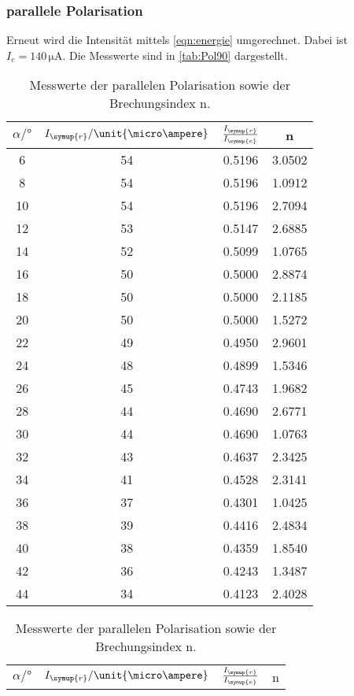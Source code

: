 \subsubsection{parallele Polarisation}
Erneut wird die Intensität mittels \autoref{eqn:energie} umgerechnet. Dabei ist $I_e = 140 \, \unit{\micro\ampere}$. Die Messwerte sind in 
\autoref{tab:Pol90} dargestellt.
\begin{table}
    \centering
    \caption{Messwerte der parallelen Polarisation sowie der Brechungsindex n.}
    \begin{tabular}{c c c c}
        \toprule
        $\alpha \mathrm{/} \unit{\degree}$  & $I_{\symup{r}}\mathrm{/}\unit{\micro\ampere}$ & $\frac{I_{\symup{r}}}{I_{\symup{e}}}$ & n\\
        \midrule
        6 & 54 & 0.5196 & 3.0502 \\
        8 & 54 & 0.5196 & 1.0912 \\
       10 & 54 & 0.5196 & 2.7094 \\
       12 & 53 & 0.5147 & 2.6885 \\
       14 & 52 & 0.5099 & 1.0765 \\
        16 & 50 & 0.5000 & 2.8874 \\
        18 & 50 & 0.5000 & 2.1185 \\
        20 & 50 & 0.5000 & 1.5272 \\
       22 & 49 & 0.4950 & 2.9601 \\
       24 & 48 & 0.4899 & 1.5346 \\
       26 & 45 & 0.4743 & 1.9682 \\
       28 & 44 & 0.4690 & 2.6771 \\
       30 & 44 & 0.4690 & 1.0763 \\
       32 & 43 & 0.4637 & 2.3425 \\
       34 & 41 & 0.4528 & 2.3141 \\
       36 & 37 & 0.4301 & 1.0425 \\
       38 & 39 & 0.4416 & 2.4834 \\
       40 & 38 & 0.4359 & 1.8540 \\
       42 & 36 & 0.4243 & 1.3487 \\
       44 & 34 & 0.4123 & 2.4028 \\
       \bottomrule
    \end{tabular}
    \quad
    \begin{tabular}{c c c c}
        \toprule
        $\alpha \mathrm{/} \unit{\degree}$  & $I_{\symup{r}}\mathrm{/}\unit{\micro\ampere}$ & $\frac{I_{\symup{r}}}{I_{\symup{e}}}$ & n\\

\end{tabular}
\end{table}
